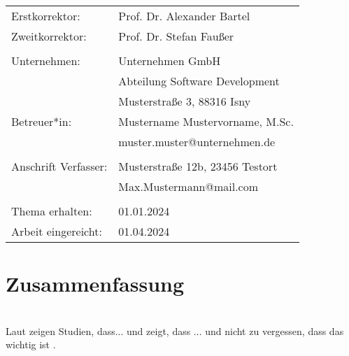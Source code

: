 \documentclass[12pt, a4paper, twoside]{article} %
\makeatletter
\newcommand*{\getAuthorAddress}{Musterstraße 12b, 23456 Testort}
\newcommand*{\getAuthorEmail}{Max.Mustermann@mail.com}
\newcommand*{\getSupervisor}{Prof. Dr. Alexander Bartel}
\newcommand*{\getCoSupervisor}{Prof. Dr. Stefan Faußer}
\newcommand*{\getAdvisor}{Mustername Mustervorname, M.Sc.}
\newcommand*{\getCompany}{Unternehmen GmbH}
\newcommand*{\getCompanyDepartment}{Abteilung Software Development}
\newcommand*{\getCompanyAddress}{Musterstraße 3, 88316 Isny}
\newcommand*{\getTopicReceivedDate}{01.01.2024}
\newcommand*{\getSubmissionDate}{01.04.2024}
\makeatother
\begin{document}
\begin{titlepage}
\begin{center}
\begin{minipage}{\textwidth}
            \begin{minipage}{0.4\textwidth}
                \raggedleft
                \small
                \begin{tabular}{l l}
                    Erstkorrektor: & \getSupervisor \\
                    Zweitkorrektor: & \getCoSupervisor \\
    			&\\
                    Unternehmen: & \getCompany \\
                                & \getCompanyDepartment \\
                    &\getCompanyAddress \\
                    Betreuer*in: & \getAdvisor \\
                    &muster.muster@unternehmen.de \\
        		&\\
                    Anschrift Verfasser: & \getAuthorAddress \\
                    &\getAuthorEmail \\
                &\\
                    Thema erhalten: & \getTopicReceivedDate \\
                    Arbeit eingereicht: & \getSubmissionDate \\
                \end{tabular}
            \end{minipage}
        \end{minipage}


        \vspace*{\fill} %
    \end{center}
\end{titlepage}

\restoregeometry %

\section*{Zusammenfassung}
\lipsum[1-2] %
\\
Laut \cite{example} zeigen Studien, dass... und \cite{lin1973} zeigt, dass ... und nicht zu vergessen, dass das wichtig ist \cite[vgl.][S. 15ff.]{Jain}.
\end{document}
